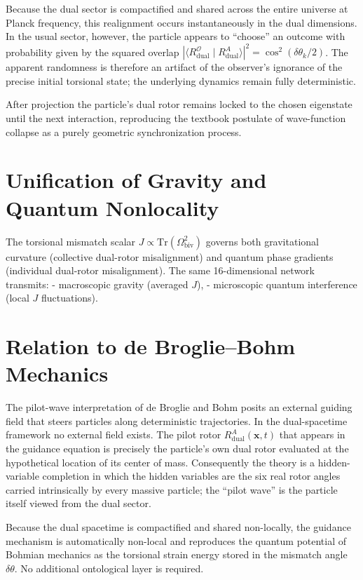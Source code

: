 \documentclass[dvipdfmx,a4paper]{article}
\begin{document}
Because the dual sector is compactified and shared across the entire universe at Planck frequency, this realignment occurs instantaneously in the dual dimensions. In the usual sector, however, the particle appears to “choose” an outcome with probability given by the squared overlap \(|\langle R_{\text{dual}}^{\mathcal{O}} \mid R_{\text{dual}}^{A}\rangle|^2 = \cos^2(\delta\theta_k/2)\). The apparent randomness is therefore an artifact of the observer’s ignorance of the precise initial torsional state; the underlying dynamics remain fully deterministic.

After projection the particle’s dual rotor remains locked to the chosen eigenstate until the next interaction, reproducing the textbook postulate of wave-function collapse as a purely geometric synchronization process.

\section{Unification of Gravity and Quantum Nonlocality}

The torsional mismatch scalar $J \propto \mathrm{Tr}(\Omega_\text{biv}^2)$ governs both gravitational curvature (collective dual-rotor misalignment) and quantum phase gradients (individual dual-rotor misalignment). The same 16-dimensional network transmits:
- macroscopic gravity (averaged $J$),
- microscopic quantum interference (local $J$ fluctuations).

\section{Relation to de Broglie–Bohm Mechanics}

The pilot-wave interpretation of de Broglie and Bohm posits an external guiding field that steers particles along deterministic trajectories. In the dual-spacetime framework no external field exists. The pilot rotor \(R_{\text{dual}}^{A}(\mathbf{x},t)\) that appears in the guidance equation is precisely the particle’s own dual rotor evaluated at the hypothetical location of its center of mass. Consequently the theory is a hidden-variable completion in which the hidden variables are the six real rotor angles carried intrinsically by every massive particle; the “pilot wave” is the particle itself viewed from the dual sector.

Because the dual spacetime is compactified and shared non-locally, the guidance mechanism is automatically non-local and reproduces the quantum potential of Bohmian mechanics as the torsional strain energy stored in the mismatch angle \(\delta\theta\). No additional ontological layer is required.
\end{document}
